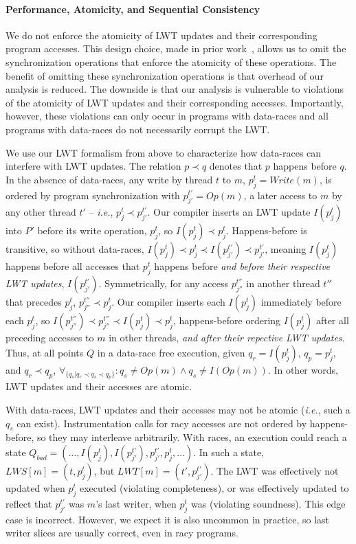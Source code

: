 \documentclass[preprint,9pt]{sigplanconf}
\newcommand{\lwt}{LWT\xspace}
\begin{document}
\paragraph{Performance, Atomicity, and Sequential Consistency}

We do not enforce the atomicity of \lwt updates and their corresponding program
accesses.  This design choice, made in prior work~\cite{fasttrack,recon},
allows us to omit the synchronization operations that enforce the atomicity of
these operations.  The benefit of omitting these synchronization operations is
that overhead of our analysis is reduced. The downside is that our analysis is
vulnerable to violations of the atomicity of \lwt updates and their
corresponding accesses. Importantly, however, these violations can only occur
in programs with data-races and all programs with data-races do not necessarily
corrupt the \lwt. 

We use our \lwt formalism from above to characterize how data-races can
interfere with \lwt updates.  The relation $p \prec q$ denotes that $p$ happens
before $q$.  In the absence of data-races, any write by thread $t$ to $m$,
$p^{t}_{j} = Write(m)$, is ordered by program synchronization with $p^{t'}_{j'}
= Op(m)$, a later access to $m$ by any other thread $t'$ -- {\em i.e.},
$p^{t}_{j} \prec p^{t'}_{j'}$.  Our compiler inserts an \lwt update
$I(p^{t}_{j})$ into $P'$ before its write operation, $p^{t}_{j}$, so
$I(p^{t}_{j}) \prec p^{t}_{j}$.  Happens-before is transitive, so without
data-races, $I(p^{t}_{j}) \prec p^{t}_{j} \prec I(p^{t'}_{j'}) \prec
p^{t'}_{j'}$, meaning $I(p^{t}_{j})$ happens before all accesses that
$p^{t}_{j}$ happens before {\em and before their respective \lwt updates},
$I(p^{t'}_{j'})$.  Symmetrically, for any access $p^{t''}_{j''}$ in another
thread $t''$ that precedes $p^{t}_{j}$, $p^{t''}_{j''} \prec p^{t}_{j}$.  Our
compiler inserts each $I(p^{t}_{j})$ immediately before each $p^{t}_{j}$, so
$I(p^{t''}_{j''}) \prec p^{t''}_{j''} \prec I(p^{t}_{j}) \prec p^{t}_{j}$,
happens-before ordering $I(p^{t}_{j})$ after all preceding accesses to $m$ in
other threads, {\em and after their repective \lwt updates}.  Thus, at all
points $Q$ in a data-race free execution, given $q_r = I(p^{t}_{j})$, $q_p =
p^{t}_{j}$, and $q_r \prec q_p$, $\forall_{ \{q_s | q_r \prec q_s \prec q_p
\}}: q_s \ne Op(m) \wedge q_s \ne I(Op(m)) $.  In other words, \lwt updates and
their accesses are atomic.

With data-races, \lwt updates and their accesses may not be atomic ({\em i.e.},
such a $q_s$ can exist).  Instrumentation calls for racy accesses are not
ordered by happens-before, so they may interleave arbitrarily.  With races, an
execution could reach a state $Q_{bad} = (\ldots, I(p^{t}_{j}), I(p^{t'}_{j'}),
p^{t'}_{j'}, p^{t}_{j}, \ldots)$.  In such a state, $LWS[m] = (t,p^{t}_{j})$,
but $LWT[m] = (t',p^{t'}_{j'})$.  The \lwt was effectively not updated when
$p^{t}_{j}$ executed (violating completeness), or was effectively updated to
reflect that $p^{t'}_{j'}$ was $m$'s last writer, when $p^{t}_{j}$ was
(violating soundness).  This edge case is incorrect. However, we expect it is
also uncommon in practice, so last writer slices are usually correct, even in
racy programs.
\end{document}
